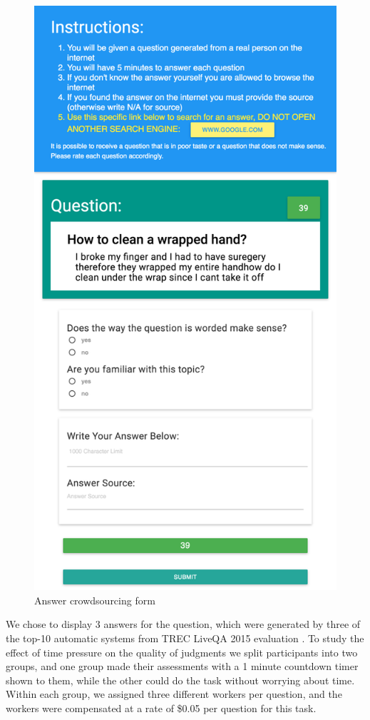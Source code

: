 \documentclass[11pt,letterpaper]{article}
\begin{document}
\begin{figure}[h!]
\centering
\includegraphics[width=0.9\linewidth]{img/answering_screenshot2}
\caption{Answer crowdsourcing form}
\label{fig:interfaces:answer}
\end{figure}


We chose to display 3 answers for the question, which were generated by three of the top-10 automatic systems from TREC LiveQA 2015 evaluation \cite{overviewliveqa15}.
To study the effect of time pressure on the quality of judgments we split participants into two groups, and one group made their assessments with a 1 minute countdown timer shown to them, while the other could do the task without worrying about time.
Within each group, we assigned three different workers per question, and the workers were compensated at a rate of \$0.05 per question for this task.
\end{document}
